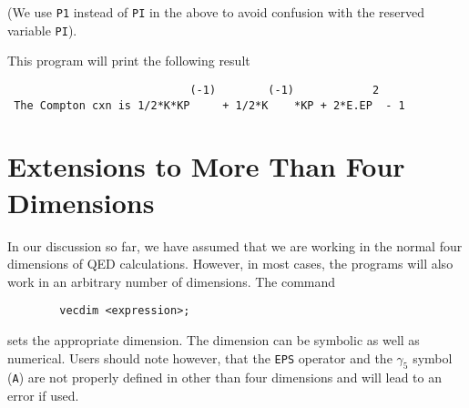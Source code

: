(We use {\tt P1} instead of {\tt PI} in the above to avoid confusion with
the reserved variable {\tt PI}).

This program will print the following result
\begin{verbatim}
                            (-1)        (-1)            2
 The Compton cxn is 1/2*K*KP     + 1/2*K    *KP + 2*E.EP  - 1
\end{verbatim}

\section{Extensions to More Than Four Dimensions}

In our discussion so far, we have assumed that we are working in the
normal four dimensions of QED calculations. However, in most cases, the
programs will also work in an arbitrary number of dimensions. The command
\begin{verbatim}
        vecdim <expression>;
\end{verbatim}
sets the appropriate dimension. The dimension can be symbolic as well as
numerical. Users should note however, that the {\tt EPS} operator and the
$\gamma_{5}$ symbol ({\tt A}) are not properly defined in other than four
dimensions and will lead to an error if used.

